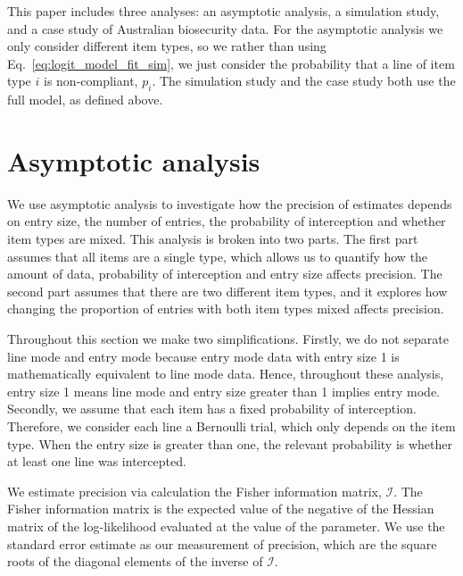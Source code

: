 \documentclass{article}
\begin{document}
This paper includes three analyses: an asymptotic analysis,
 a simulation study, and a case study of Australian biosecurity data. For the asymptotic analysis we only consider different item types, so we rather than using Eq.~\eqref{eq:logit_model_fit_sim}, we just consider the probability that a line of item type \(i\) is non-compliant, \(p_i\). The simulation study and the case study both use the full model, as defined above. 


\section{Asymptotic analysis}
We use asymptotic analysis to investigate how the precision of estimates depends on entry size, the number of entries, the probability of interception and whether item types are mixed. This analysis is broken into two parts. The first part assumes that all items are a single type, which allows us to quantify how the amount of data, probability of interception and entry size affects precision. The second part assumes that there are two different item types, and it explores how changing the proportion of entries with both item types mixed affects precision.

Throughout this section we make two simplifications. Firstly, we do not separate line mode and entry mode because entry mode data with entry size 1 is mathematically equivalent to line mode data. Hence, throughout these analysis, entry size 1 means line mode and entry size greater than 1 implies entry mode. Secondly, we  assume that each item has a fixed probability of interception. Therefore, we consider each line a Bernoulli trial, which only depends on the item type. When the entry size is greater than one, the relevant probability is whether at least one line was intercepted.

We estimate precision via calculation the Fisher information matrix, \(\mathcal{I}\). The Fisher information  matrix is the expected value of the negative of the Hessian matrix of the log-likelihood evaluated at the value of the parameter. We use the standard error estimate as our measurement of precision, which are the square roots of the diagonal elements of the inverse of \(\mathcal{I}\).
\end{document}
